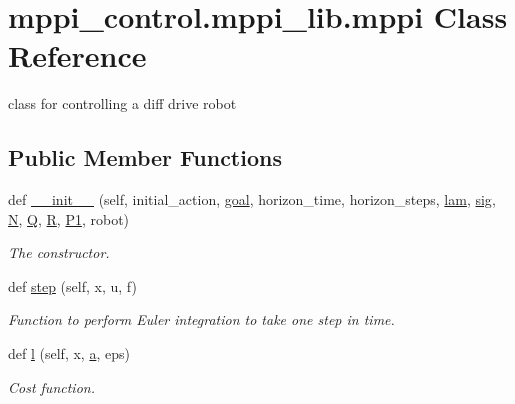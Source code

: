 \hypertarget{classmppi__control_1_1mppi__lib_1_1mppi}{}\section{mppi\+\_\+control.\+mppi\+\_\+lib.\+mppi Class Reference}
\label{classmppi__control_1_1mppi__lib_1_1mppi}


class for controlling a diff drive robot  


\subsection*{Public Member Functions}
\begin{DoxyCompactItemize}
\item 
def \hyperlink{classmppi__control_1_1mppi__lib_1_1mppi_a76565f0e7592710c414d86b6c010460f}{\+\_\+\+\_\+init\+\_\+\+\_\+} (self, initial\+\_\+action, \hyperlink{classmppi__control_1_1mppi__lib_1_1mppi_a68ee5156799bb07db88f240790c5cf5f}{goal}, horizon\+\_\+time, horizon\+\_\+steps, \hyperlink{classmppi__control_1_1mppi__lib_1_1mppi_ad88a6859f7ba1407c74749e3b29e479c}{lam}, \hyperlink{classmppi__control_1_1mppi__lib_1_1mppi_abb18e20a9d313fe78a93c36528f7aa5b}{sig}, \hyperlink{classmppi__control_1_1mppi__lib_1_1mppi_a87e95b1bcdc996d76c4cb69d7ad27155}{N}, \hyperlink{classmppi__control_1_1mppi__lib_1_1mppi_aeb8c77f8575d92ea4192f5a84c79ffd8}{Q}, \hyperlink{classmppi__control_1_1mppi__lib_1_1mppi_a67ff8a6e353fe0d6c3f6ed6fe27448da}{R}, \hyperlink{classmppi__control_1_1mppi__lib_1_1mppi_a930d221e939ac8f594941d05c77ab853}{P1}, robot)
\begin{DoxyCompactList}\small\item\em The constructor. \end{DoxyCompactList}\item 
def \hyperlink{classmppi__control_1_1mppi__lib_1_1mppi_aa67fc09d56d7ada464f473a6f1f3bc18}{step} (self, x, u, f)
\begin{DoxyCompactList}\small\item\em Function to perform Euler integration to take one step in time. \end{DoxyCompactList}\item 
def \hyperlink{classmppi__control_1_1mppi__lib_1_1mppi_a68e30fe4b04af8aae056c266e89b9efb}{l} (self, x, \hyperlink{classmppi__control_1_1mppi__lib_1_1mppi_a1ee8d442a2e68fbd95869aeb88ede25b}{a}, eps)
\begin{DoxyCompactList}\small\item\em Cost function. \end{DoxyCompactList}\item 

\end{DoxyCompactItemize}
